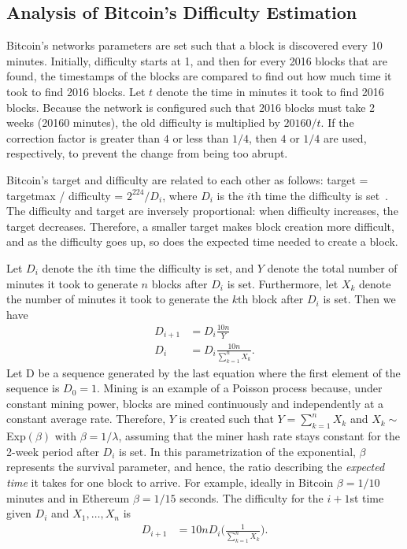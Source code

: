 \subsection{Analysis of Bitcoin's Difficulty Estimation}
 Bitcoin's networks parameters are set such that a block is discovered every 10 minutes. Initially, difficulty starts at 1, and then for every 2016 blocks that are found, the timestamps of the blocks are compared to find out how much time it took to find 2016 blocks. Let $t$ denote the time in minutes it took to find 2016 blocks. Because the network is configured such that 2016 blocks must take 2 weeks (20160 minutes), the old difficulty is multiplied by $20160 / t$. If the correction factor is greater than $4$ or less than $1/4$, then $4$ or $1/4$ are used, respectively, to prevent the change from being too abrupt.
\par \noindent Bitcoin's target and difficulty are related to each other as follows: target = targetmax / difficulty = $2^{224}/{D_i}$, where $D_i$ is the $i$th time the difficulty is set~\cite{bitcoin:difficulty}. The difficulty and target are inversely proportional: when difficulty increases, the target decreases. Therefore, a smaller target makes block creation more difficult, and as the difficulty goes up, so does the expected time needed to create a block.

Let $D_i$ denote the $i$th time the difficulty is set, and $Y$ denote the total number of minutes it took to generate $n$ blocks after $D_i$ is set. Furthermore, let $X_k$ denote the number of minutes it took to generate the $k$th block after $D_i$ is set. Then we have
\begin{align}
D_{i+1} &= D_i \frac{10n}{Y} \\
D_{i} &=D_i \frac{10n}{ \sum_{k=1}^n X_k}.
\end{align}
Let D be a sequence generated by the last equation where the first element of the sequence is $D_0 = 1$. Mining is an example of a Poisson process because, under constant
mining power, blocks are mined continuously and independently at a
constant average rate.  Therefore, $Y$ is created such that $Y = \sum_{k=1}^{n} X_k$ and $X_k \sim$ Exp$(\beta)$ with $\beta = 1/\lambda$, assuming that the miner hash rate stays constant for the 2-week period after $D_i$ is set. In this parametrization of the exponential, $\beta$ represents the survival parameter, and hence, the ratio describing the {\em expected time} it takes for one block to arrive. For example, ideally in Bitcoin $\beta=1/10$ minutes and in Ethereum $\beta=1/15$ seconds. The difficulty for the $i+1$st time given $D_i$ and $X_1, \dots, X_n$ is
\begin{align}
D_{i+1} &= 10nD_i \Bigg(\frac{1}{\sum_{k=1}^{n} X_k}\Bigg).
\end{align}

